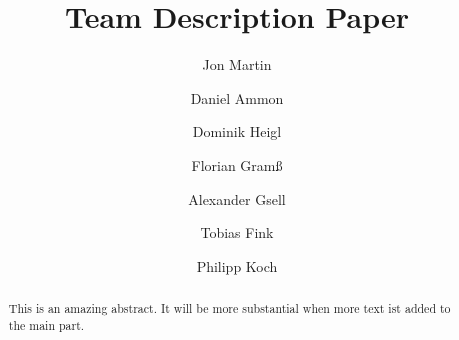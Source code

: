\documentclass[runningheads,a4paper]{llncs}
\begin{document}
\mainmatter  %

\title{Team Description Paper}


%
%
\author{Jon Martin
\and Daniel Ammon\and Dominik Heigl\and Florian Gram{\ss} \and Alexander Gsell \and Tobias Fink \and Philipp Koch
}



%
%

\maketitle


\begin{abstract}
This is an amazing abstract. It will be more substantial when more text ist added to the main part.
\end{abstract}

\end{document}
